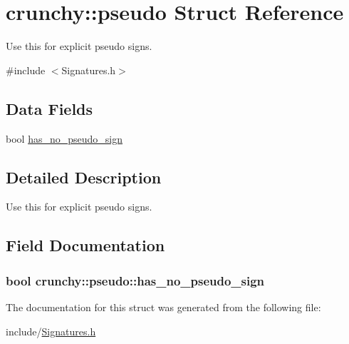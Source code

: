 \hypertarget{structcrunchy_1_1pseudo}{}\section{crunchy\+:\+:pseudo Struct Reference}
\label{structcrunchy_1_1pseudo}


Use this for explicit pseudo signs.  




{\ttfamily \#include $<$Signatures.\+h$>$}

\subsection*{Data Fields}
\begin{DoxyCompactItemize}
\item 
bool \hyperlink{structcrunchy_1_1pseudo_a2ee9a07f78935a9382213249e98b43fb}{has\+\_\+no\+\_\+pseudo\+\_\+sign}
\end{DoxyCompactItemize}


\subsection{Detailed Description}
Use this for explicit pseudo signs. 

\subsection{Field Documentation}
\hypertarget{structcrunchy_1_1pseudo_a2ee9a07f78935a9382213249e98b43fb}{}
\subsubsection[{has\+\_\+no\+\_\+pseudo\+\_\+sign}]{\setlength{\rightskip}{0pt plus 5cm}bool crunchy\+::pseudo\+::has\+\_\+no\+\_\+pseudo\+\_\+sign}\label{structcrunchy_1_1pseudo_a2ee9a07f78935a9382213249e98b43fb}


The documentation for this struct was generated from the following file\+:\begin{DoxyCompactItemize}
\item 
include/\hyperlink{_signatures_8h}{Signatures.\+h}\end{DoxyCompactItemize}
